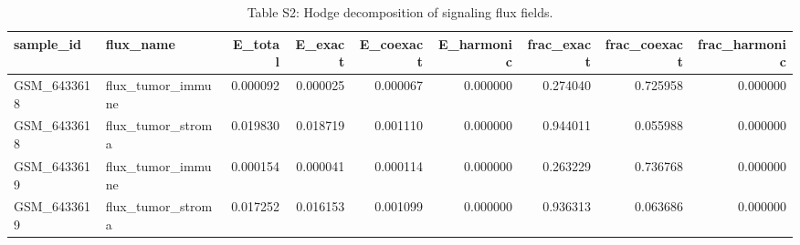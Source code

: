 \begin{table}
\caption{Table S2: Hodge decomposition of signaling flux fields.}
\label{tab:tnbc_hodge_energy_summary}
\begin{tabular}{llrrrrrrr}
\toprule
sample_id & flux_name & E_total & E_exact & E_coexact & E_harmonic & frac_exact & frac_coexact & frac_harmonic \\
\midrule
GSM_6433618 & flux_tumor_immune & 0.000092 & 0.000025 & 0.000067 & 0.000000 & 0.274040 & 0.725958 & 0.000000 \\
GSM_6433618 & flux_tumor_stroma & 0.019830 & 0.018719 & 0.001110 & 0.000000 & 0.944011 & 0.055988 & 0.000000 \\
GSM_6433619 & flux_tumor_immune & 0.000154 & 0.000041 & 0.000114 & 0.000000 & 0.263229 & 0.736768 & 0.000000 \\
GSM_6433619 & flux_tumor_stroma & 0.017252 & 0.016153 & 0.001099 & 0.000000 & 0.936313 & 0.063686 & 0.000000 \\
\bottomrule
\end{tabular}
\end{table}
